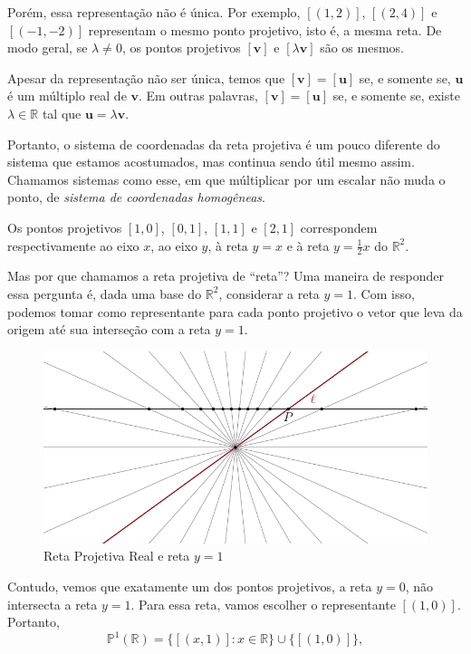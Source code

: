 Porém, essa representação não é única.
Por exemplo, \([(1, 2)]\), \([(2, 4)]\) e \([(-1, -2)]\) representam o mesmo ponto projetivo, isto é, a mesma reta.
De modo geral, se \(\lambda \neq 0\), os pontos projetivos \([\mathbf{v}]\) e \([\lambda \mathbf{v}]\) são os mesmos.

Apesar da representação não ser única, temos que \([\mathbf{v}] = [\mathbf{u}]\) se, e somente se, \(\mathbf{u}\) é um múltiplo real de \(\mathbf{v}\).
Em outras palavras, \([\mathbf{v}] = [\mathbf{u}]\) se, e somente se, existe \(\lambda \in \mathbb{R}\) tal que \(\mathbf{u} = \lambda\mathbf{v}\).

Portanto, o sistema de coordenadas da reta projetiva é um pouco diferente do sistema que estamos acostumados, mas continua sendo útil mesmo assim. Chamamos sistemas como esse, em que múltiplicar por um escalar não muda o ponto, de \emph{sistema de coordenadas homogêneas}.

\begin{exmp}
Os pontos projetivos $[1,0]$, $[0,1]$, $[1,1]$ e $[2,1]$ correspondem respectivamente ao eixo $x$, ao eixo $y$, à reta $y=x$ e à reta $y=\frac{1}{2}x$ do $\mathbb{R}^2$.
\end{exmp}

Mas por que chamamos a reta projetiva de ``reta''? Uma maneira de responder essa pergunta é, dada uma base do $\mathbb{R}^2$, considerar a reta $y=1$. Com isso, podemos tomar como representante para cada ponto projetivo o vetor que leva da origem até sua interseção  com a reta $y=1$.

\begin{figure}[hbtp]
  \centering
  \includegraphics{figures/retaprojetivaretay1.pdf}
  \caption{Reta Projetiva Real e reta \(y = 1\)}
\end{figure}

Contudo, vemos que exatamente um dos pontos projetivos, a reta \(y = 0\), não intersecta a reta \(y = 1\).
Para essa reta, vamos escolher o representante $[(1,0)]$.
Portanto, 
\begin{equation}
	\mathbb{P}^1(\mathbb{R}) = \{ [(x,1)] : x \in \mathbb{R} \} \cup \{[(1,0)]\},
\end{equation}

